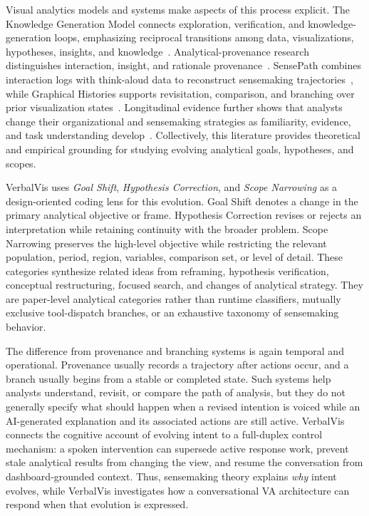 \documentclass[journal]{IEEEtran}
\begin{document}
Visual analytics models and systems make aspects of this process explicit. The Knowledge Generation Model connects exploration, verification, and knowledge-generation loops, emphasizing reciprocal transitions among data, visualizations, hypotheses, insights, and knowledge~\cite{sacha2014knowledge}. Analytical-provenance research distinguishes interaction, insight, and rationale provenance~\cite{ragan2016provenance}. SensePath combines interaction logs with think-aloud data to reconstruct sensemaking trajectories~\cite{nguyen2016sensepath}, while Graphical Histories supports revisitation, comparison, and branching over prior visualization states~\cite{heer2008graphical}. Longitudinal evidence further shows that analysts change their organizational and sensemaking strategies as familiarity, evidence, and task understanding develop~\cite{davidson2023evolution}. Collectively, this literature provides theoretical and empirical grounding for studying evolving analytical goals, hypotheses, and scopes.

VerbalVis uses \emph{Goal Shift}, \emph{Hypothesis Correction}, and \emph{Scope Narrowing} as a design-oriented coding lens for this evolution. Goal Shift denotes a change in the primary analytical objective or frame. Hypothesis Correction revises or rejects an interpretation while retaining continuity with the broader problem. Scope Narrowing preserves the high-level objective while restricting the relevant population, period, region, variables, comparison set, or level of detail. These categories synthesize related ideas from reframing, hypothesis verification, conceptual restructuring, focused search, and changes of analytical strategy. They are paper-level analytical categories rather than runtime classifiers, mutually exclusive tool-dispatch branches, or an exhaustive taxonomy of sensemaking behavior.

The difference from provenance and branching systems is again temporal and operational. Provenance usually records a trajectory after actions occur, and a branch usually begins from a stable or completed state. Such systems help analysts understand, revisit, or compare the path of analysis, but they do not generally specify what should happen when a revised intention is voiced while an AI-generated explanation and its associated actions are still active. VerbalVis connects the cognitive account of evolving intent to a full-duplex control mechanism: a spoken intervention can supersede active response work, prevent stale analytical results from changing the view, and resume the conversation from dashboard-grounded context. Thus, sensemaking theory explains \emph{why} intent evolves, while VerbalVis investigates how a conversational VA architecture can respond when that evolution is expressed.
\end{document}
